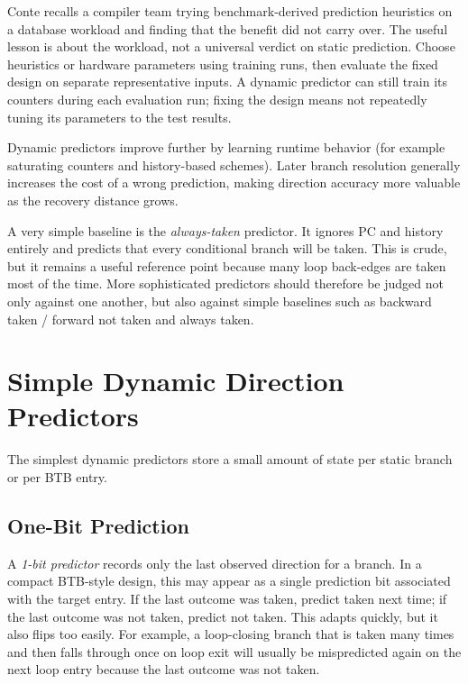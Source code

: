 Conte recalls a compiler team trying benchmark-derived prediction heuristics on a database workload and finding that the benefit did not carry over.
The useful lesson is about the workload, not a universal verdict on static prediction.
Choose heuristics or hardware parameters using training runs, then evaluate the fixed design on separate representative inputs.
A dynamic predictor can still train its counters during each evaluation run; fixing the design means not repeatedly tuning its parameters to the test results.

Dynamic predictors improve further by learning runtime behavior (for example saturating counters and history-based schemes).
Later branch resolution generally increases the cost of a wrong prediction, making direction accuracy more valuable as the recovery distance grows.

A very simple baseline is the \textit{always-taken} predictor.
It ignores PC and history entirely and predicts that every conditional branch will be taken.
This is crude, but it remains a useful reference point because many loop back-edges are taken most of the time.
More sophisticated predictors should therefore be judged not only against one another, but also against simple baselines such as backward taken / forward not taken and always taken.


\section{Simple Dynamic Direction Predictors}\label{sec:auto-0430}
The simplest dynamic predictors store a small amount of state per static branch or per BTB entry.

\subsection{One-Bit Prediction}\label{subsec:auto-0100}
A \textit{1-bit predictor} records only the last observed direction for a branch.
In a compact BTB-style design, this may appear as a single prediction bit associated with the target entry.
If the last outcome was taken, predict taken next time; if the last outcome was not taken, predict not taken.
This adapts quickly, but it also flips too easily.
For example, a loop-closing branch that is taken many times and then falls through once on loop exit will usually be mispredicted again on the next loop entry because the last outcome was not taken.

